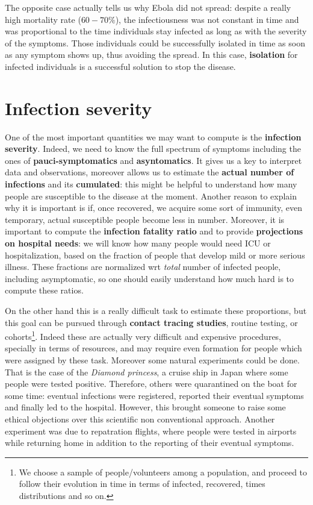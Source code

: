 \documentclass[../main/main.tex]{subfiles}
\begin{document}
The opposite case actually tells us why Ebola did not spread: despite a really high mortality rate ($60-70\%$), the infectiousness was not constant in time and was proportional to the time individuals stay infected as long as with the severity of the symptoms. Those individuals could be successfully isolated in time as soon as any symptom shows up, thus avoiding the spread. In this case, \textbf{isolation} for infected individuals is a successful solution to stop the disease.



\section{Infection severity}

One of the most important quantities we may want to compute is the \textbf{infection severity}. Indeed, we need to know the full spectrum of symptoms including the ones of \textbf{pauci-symptomatics} and \textbf{asyntomatics}. It gives us a key to interpret data and observations, moreover allows us to estimate the \textbf{actual number of infections} and its \textbf{cumulated}: this might be helpful to understand how many people are susceptible to the disease at the moment. Another reason to explain why it is important is if, once recovered, we acquire some sort of immunity, even temporary, actual susceptible people become less in number. Moreover, it is important to compute the \textbf{infection fatality ratio} and to provide \textbf{projections on hospital needs}: we will know how many people would need ICU or hospitalization, based on the fraction of people that develop mild or more serious illness. These fractions are normalized wrt \textit{total} number of infected people, including asymptomatic, so one should easily understand how much hard is to compute these ratios.

On the other hand this is a really difficult task to estimate these proportions, but this goal can be pursued through \textbf{contact tracing studies}, routine testing, or cohorts\footnote{We choose a sample of people/volunteers among a population, and proceed to follow their evolution in time in terms of infected, recovered, times distributions and so on.}. Indeed these are actually very difficult and expensive procedures, specially in terms of resources, and may require even formation for people which were assigned by these task. Moreover some natural experiments could be done. That is the case of the \textit{Diamond princess}, a cruise ship in Japan where some people were tested positive. Therefore, others were quarantined on the boat for some time: eventual infections were registered, reported their eventual symptoms and finally led to the hospital. However, this brought someone to raise some ethical objections over this scientific non conventional approach. Another experiment was due to repatration flights, where people were tested in airports while returning home in addition to the reporting of their eventual symptoms.
\end{document}
